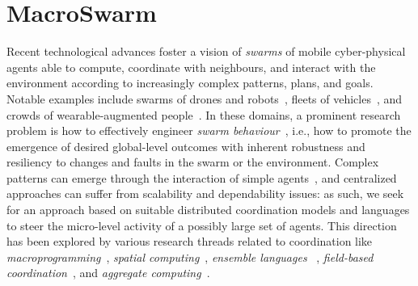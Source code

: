 %
%
%

\lstset{language=scafi}

\newcommand{\MacroSwarm}{{\sc{}MacroSwarm}}


\newcommand{\meta}[1]{{\color{blue} #1}}%
\chapter{\MacroSwarm{}}
\minitoc%
%
Recent technological advances 
 foster a vision of \emph{swarms} of mobile cyber-physical agents able to compute, coordinate with neighbours, and interact with the environment according to increasingly complex patterns, plans, and goals.
%
Notable examples include swarms of drones and robots~\cite{DBLP:journals/firai/SchranzUSE20}, 
 fleets of vehicles~\cite{DBLP:journals/jiii/TahirBHTP19},
 and crowds of wearable-augmented people~\cite{DBLP:journals/wc/GalininaMH0K18}.
%
In these domains,
 a prominent research problem
 is how to effectively engineer \emph{swarm behaviour}~\cite{DBLP:journals/swarm/BrambillaFBD13},
 i.e., how to promote 
 the emergence of desired global-level outcomes %
 with inherent robustness and resiliency to changes and faults in the swarm or the environment.
%
Complex patterns can emerge through the interaction of simple agents~\cite{bonabeau1999swarmintelligence-book}, and centralized approaches %
 can suffer from scalability and dependability issues: as such,  
 we seek for an approach based on %
 suitable distributed coordination models and languages to steer the micro-level activity of a possibly large set of agents.
%
This %
 direction has been explored by various research threads related to coordination
 like  \emph{macroprogramming}~\cite{Casadei2023,regiment}, 
 \emph{spatial computing}~\cite{SpatialIGI2013},
 \emph{ensemble languages}%
~\cite{scel2014taas,abd2020programming-cas-attribute-based}, 
 \emph{field-based coordination}~\cite{DBLP:journals/corr/Lluch-LafuenteL16,Mamei:2004a}, and \emph{aggregate computing}~\cite{DBLP:journals/jlap/ViroliBDACP19}. 
 
